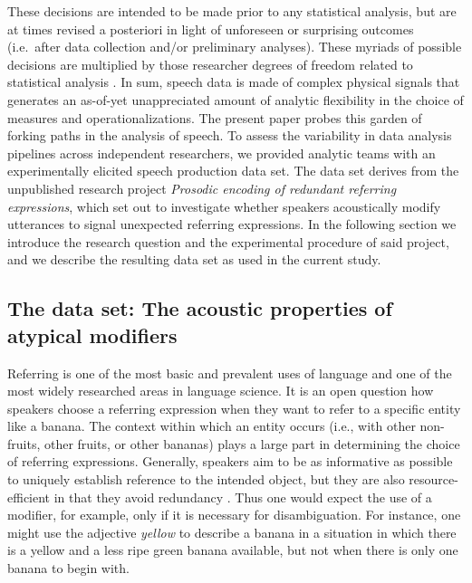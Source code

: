 \documentclass[Review,times,sageh]{sagej}
\begin{document}
These decisions are intended to be made prior to any statistical analysis, but are at times revised a posteriori in light of unforeseen or surprising outcomes (i.e.~after data collection and/or preliminary analyses).
These myriads of possible decisions are multiplied by those researcher degrees of freedom related to statistical analysis \citep[e.g.~][]{wicherts2016}.
In sum, speech data is made of complex physical signals that generates an as-of-yet unappreciated amount of analytic flexibility in the choice of measures and operationalizations.
The present paper probes this garden of forking paths in the analysis of speech.
To assess the variability in data analysis pipelines across independent researchers, we provided analytic teams with an experimentally elicited speech production data set.
The data set derives from the unpublished research project \emph{Prosodic encoding of redundant referring expressions}, which set out to investigate whether speakers acoustically modify utterances to signal unexpected referring expressions.
In the following section we introduce the research question and the experimental procedure of said project, and we describe the resulting data set as used in the current study.

\hypertarget{s:dataset}{%
\subsection{The data set: The acoustic properties of atypical modifiers}\label{s:dataset}}

Referring is one of the most basic and prevalent uses of language and one of the most widely researched areas in language science.
It is an open question how speakers choose a referring expression when they want to refer to a specific entity like a banana.
The context within which an entity occurs (i.e., with other non-fruits, other fruits, or other bananas) plays a large part in determining the choice of referring expressions.
Generally, speakers aim to be as informative as possible to uniquely establish reference to the intended object, but they are also resource-efficient in that they avoid redundancy \citep{grice1975logic}.
Thus one would expect the use of a modifier, for example, only if it is necessary for disambiguation.
For instance, one might use the adjective \emph{yellow} to describe a banana in a situation in which there is a yellow and a less ripe green banana available, but not when there is only one banana to begin with.
\end{document}
